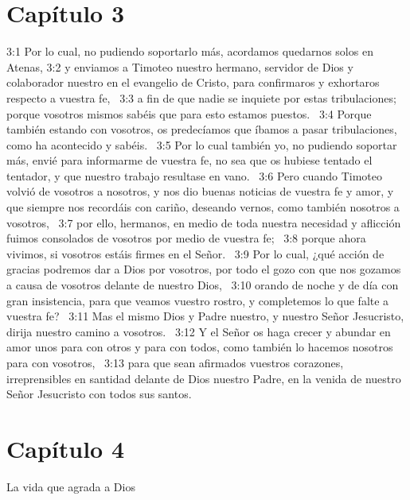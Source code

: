 \section*{Capítulo 3 }

3:1 Por lo cual, no pudiendo soportarlo más, acordamos quedarnos solos en Atenas, 
3:2 y enviamos a Timoteo nuestro hermano, servidor de Dios y colaborador nuestro en el evangelio de Cristo, para confirmaros y exhortaros respecto a vuestra fe,  
3:3 a fin de que nadie se inquiete por estas tribulaciones; porque vosotros mismos sabéis que para esto estamos puestos.  
3:4 Porque también estando con vosotros, os predecíamos que íbamos a pasar tribulaciones, como ha acontecido y sabéis.  
3:5 Por lo cual también yo, no pudiendo soportar más, envié para informarme de vuestra fe, no sea que os hubiese tentado el tentador, y que nuestro trabajo resultase en vano.  
3:6 Pero cuando Timoteo volvió de vosotros a nosotros, y nos dio buenas noticias de vuestra fe y amor, y que siempre nos recordáis con cariño, deseando vernos, como también nosotros a vosotros,  
3:7 por ello, hermanos, en medio de toda nuestra necesidad y aflicción fuimos consolados de vosotros por medio de vuestra fe;  
3:8 porque ahora vivimos, si vosotros estáis firmes en el Señor.  
3:9 Por lo cual, ¿qué acción de gracias podremos dar a Dios por vosotros, por todo el gozo con que nos gozamos a causa de vosotros delante de nuestro Dios,  
3:10 orando de noche y de día con gran insistencia, para que veamos vuestro rostro, y completemos lo que falte a vuestra fe?  
3:11 Mas el mismo Dios y Padre nuestro, y nuestro Señor Jesucristo, dirija nuestro camino a vosotros.  
3:12 Y el Señor os haga crecer y abundar en amor unos para con otros y para con todos, como también lo hacemos nosotros para con vosotros,  
3:13 para que sean afirmados vuestros corazones, irreprensibles en santidad delante de Dios nuestro Padre, en la venida de nuestro Señor Jesucristo con todos sus santos.  
\section*{Capítulo 4 }
La vida que agrada a Dios  

